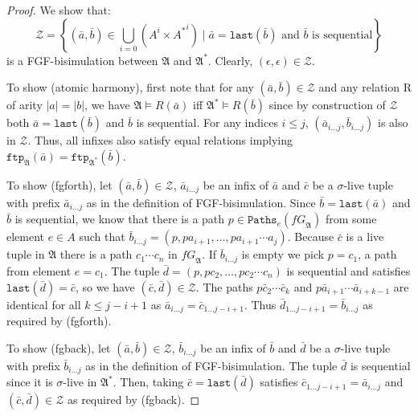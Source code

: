 \documentclass[draft]{scrartcl}
\theoremstyle{definition}
\newcommand{\last}[1]{\mathtt{last}(#1)}
\begin{document}
\begin{proof}
We show that:
\[ \mathcal{Z} = \left\{(\bar{a}, \bar{b}) \in \bigcup_{i=0}(A^i \times {A^*}^i) \mid \text{$\bar{a} = \last{\bar{b}}$ and $\bar{b}$ is sequential}\right\} \]
is a FGF-bisimulation between $\mathfrak{A}$ and $\mathfrak{A}^*$. Clearly, $(\epsilon, \epsilon) \in \mathcal{Z}$.

To show (atomic harmony), first note that for any $(\bar{a}, \bar{b}) \in \mathcal{Z}$ and any relation R of arity $|a| = |b|$, we have $\mathfrak{A} \models R(\bar{a})$ iff $\mathfrak{A}^* \models R(\bar{b})$ since by construction of $\mathcal{Z}$ both $\bar{a} = \last{\bar{b}}$ and $\bar{b}$ is sequential. For any indices $i \leq j$, $(\bar{a}_{i\ldots{}j}, \bar{b}_{i\ldots{}j})$ is also in $\mathcal{Z}$. Thus, all infixes also satisfy equal relations implying $\mathtt{ftp}_{\mathfrak{A}}(\bar{a}) = \mathtt{ftp}_{\mathfrak{A}^*}(\bar{b})$.

To show (fgforth), let $(\bar{a}, \bar{b}) \in \mathcal{Z}$, $\bar{a}_{i\ldots{}j}$ be an infix of $\bar{a}$ and $\bar{c}$ be a $\sigma$-live tuple with prefix $\bar{a}_{i\ldots{}j}$ as in the definition of FGF-bisimulation.
Since $\bar{b} = \last{\bar{a}}$ and $\bar{b}$ is sequential, we know that there is a path $p \in \mathtt{Paths}_e(\mathit{fG}_\mathfrak{A})$ from some element $e \in A$ such that $\bar{b}_{i\ldots{}j} = (p, p a_{i+1}, \ldots, p a_{i+1} \cdots a_j)$.
Because $\bar{c}$ is a live tuple in $\mathfrak{A}$ there is a path $c_1 \cdots c_n$ in $\mathit{fG}_\mathfrak{A}$. If $\bar{b}_{i\ldots{}j}$ is empty we pick $p = c_1$, a path from element $e = c_1$.
The tuple $\bar{d} = (p, p c_2, \ldots, p c_2 \cdots c_n)$ is sequential and satisfies $\last{\bar{d}} = \bar{c}$, so we have $(\bar{c}, \bar{d}) \in \mathcal{Z}$.
The paths $p \bar{c}_2 \cdots \bar{c}_{k}$ and $p \bar{a}_{i+1} \cdots \bar{a}_{i+k-1}$ are identical for all $k \leq j-i+1$ as $\bar{a}_{i\ldots{}j} = \bar{c}_{1\ldots{}j-i+1}$.
Thus $\bar{d}_{1\ldots{}j-i+1} = \bar{b}_{i\ldots{}j}$ as required by (fgforth).

To show (fgback), let $(\bar{a}, \bar{b}) \in \mathcal{Z}$, $\bar{b}_{i\ldots{}j}$ be an infix of $\bar{b}$ and $\bar{d}$ be a $\sigma$-live tuple with prefix $\bar{b}_{i\ldots{}j}$ as in the definition of FGF-bisimulation. The tuple $\bar{d}$ is sequential since it is $\sigma$-live in $\mathfrak{A}^*$. Then, taking $\bar{c} = \last{\bar{d}}$ satisfies $\bar{c}_{1\ldots{}j-i+1} = \bar{a}_{i\ldots{}j}$ and $(\bar{c}, \bar{d}) \in \mathcal{Z}$ as required by (fgback).
\end{proof}
\end{document}
